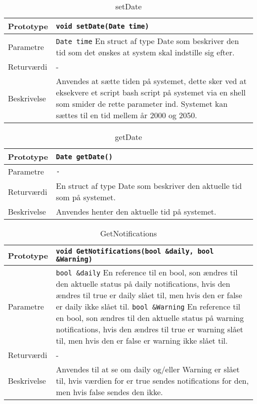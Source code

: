 \begin{table}[h]
\begin{tabularx}{\textwidth}{| >{\raggedright\arraybackslash}p{2.5 cm} | >{\raggedright\arraybackslash}X |} \hline
Prototype & \texttt{void setDate(Date time)} \\\hline
Parametre & \texttt{Date time} \newline En struct af type Date som beskriver den tid som det ønskes at system skal indstille sig efter. \\\hline
Returværdi & - \\\hline
Beskrivelse & Anvendes at sætte tiden på systemet, dette sker ved at eksekvere et script bash script på systemet via en shell som smider de rette parameter ind. Systemet kan sættes til en tid mellem år 2000 og 2050. \\\hline
\end{tabularx}
\caption{setDate}
\label{table:setDate}
\end{table}

\begin{table}[h]
\begin{tabularx}{\textwidth}{| >{\raggedright\arraybackslash}p{2.5 cm} | >{\raggedright\arraybackslash}X |} \hline
Prototype & \texttt{Date getDate()} \\\hline
Parametre & \texttt{-} \newline \\\hline
Returværdi & En struct af type Date som beskriver den aktuelle tid som på systemet. \\\hline
Beskrivelse & Anvendes henter den aktuelle tid på systemet.\\\hline
\end{tabularx}
\caption{getDate}
\label{table:getDate}
\end{table}

\begin{table}[h]
\begin{tabularx}{\textwidth}{| >{\raggedright\arraybackslash}p{2.5 cm} | >{\raggedright\arraybackslash}X |} \hline
Prototype & \texttt{void GetNotifications(bool \&daily, bool \&Warning)} \\\hline
Parametre & \texttt{bool \&daily} \newline En reference til en bool, son ændres til den aktuelle status på daily notifications, hvis den ændres til true er daily slået til, men hvis den er false er daily ikke slået til.
\newline
\texttt{bool \&Warning} \newline En reference til en bool, son ændres til den aktuelle status på warning notifications, hvis den ændres til true er warning slået til, men hvis den er false er warning ikke slået til.
 \\\hline
Returværdi & - \\\hline
Beskrivelse & Anvendes til at se om daily og/eller Warning er slået til, hvis værdien for er true sendes notifications for den, men hvis false sendes den ikke.\\\hline
\end{tabularx}
\caption{GetNotifications}
\label{table:GetNotifications}
\end{table}

